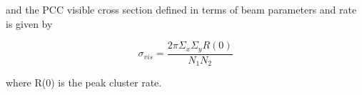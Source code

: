 and the PCC visible cross section defined in terms of beam parameters and rate is given by 

\begin{equation}
\sigma_{vis} = \frac{2 \pi \Sigma_x \Sigma_y R(0)}{N_1 N_2} 
\end{equation}

where R(0) is the peak cluster rate. %



